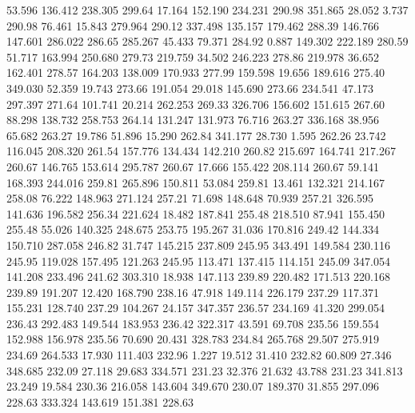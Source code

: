   53.596  136.412  238.305       299.64
  17.164  152.190  234.231       290.98
 351.865   28.052    3.737       290.98
  76.461   15.843  279.964       290.12
 337.498  135.157  179.462       288.39
 146.766  147.601  286.022       286.65
 285.267   45.433   79.371       284.92
   0.887  149.302  222.189       280.59
  51.717  163.994  250.680       279.73
 219.759   34.502  246.223       278.86
 219.978   36.652  162.401       278.57
 164.203  138.009  170.933       277.99
 159.598   19.656  189.616       275.40
 349.030   52.359   19.743       273.66
 191.054   29.018  145.690       273.66
 234.541   47.173  297.397       271.64
 101.741   20.214  262.253       269.33
 326.706  156.602  151.615       267.60
  88.298  138.732  258.753       264.14
 131.247  131.973   76.716       263.27
 336.168   38.956   65.682       263.27
  19.786   51.896   15.290       262.84
 341.177   28.730    1.595       262.26
  23.742  116.045  208.320       261.54
 157.776  134.434  142.210       260.82
 215.697  164.741  217.267       260.67
 146.765  153.614  295.787       260.67
  17.666  155.422  208.114       260.67
  59.141  168.393  244.016       259.81
 265.896  150.811   53.084       259.81
  13.461  132.321  214.167       258.08
  76.222  148.963  271.124       257.21
  71.698  148.648   70.939       257.21
 326.595  141.636  196.582       256.34
 221.624   18.482  187.841       255.48
 218.510   87.941  155.450       255.48
  55.026  140.325  248.675       253.75
 195.267   31.036  170.816       249.42
 144.334  150.710  287.058       246.82
  31.747  145.215  237.809       245.95
 343.491  149.584  230.116       245.95
 119.028  157.495  121.263       245.95
 113.471  137.415  114.151       245.09
 347.054  141.208  233.496       241.62
 303.310   18.938  147.113       239.89
 220.482  171.513  220.168       239.89
 191.207   12.420  168.790       238.16
  47.918  149.114  226.179       237.29
 117.371  155.231  128.740       237.29
 104.267   24.157  347.357       236.57
 234.169   41.320  299.054       236.43
 292.483  149.544  183.953       236.42
 322.317   43.591   69.708       235.56
 159.554  152.988  156.978       235.56
  70.690   20.431  328.783       234.84
 265.768   29.507  275.919       234.69
 264.533   17.930  111.403       232.96
   1.227   19.512   31.410       232.82
  60.809   27.346  348.685       232.09
  27.118   29.683  334.571       231.23
  32.376   21.632   43.788       231.23
 341.813   23.249   19.584       230.36
 216.058  143.604  349.670       230.07
 189.370   31.855  297.096       228.63
 333.324  143.619  151.381       228.63
